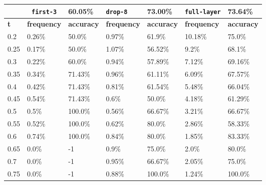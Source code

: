 
\begin{table}[t]
\centering
\begin{tabular}{lllllll} %
\hline

\multicolumn{1}{c}{}& 
\multicolumn{1}{c}{\texttt{first-3}} & \multicolumn{1}{l|}{60.05\%} 
& \multicolumn{1}{l}{\texttt{drop-8}} & \multicolumn{1}{l|}{73.00\%}
& \multicolumn{1}{l}{\texttt{full-layer}} & 73.64\%
\\ \hline
\multicolumn{1}{l|}{\textbf{t}} &
\multicolumn{1}{l|}{\textbf{frequency}} & 
\multicolumn{1}{l|}{\textbf{accuracy}} & 
\multicolumn{1}{l|}{\textbf{frequency}} & 
\multicolumn{1}{l|}{\textbf{accuracy}} & 
\multicolumn{1}{l|}{\textbf{frequency}} & 
\multicolumn{1}{l|}{\textbf{accuracy}} \\ \hline
	\multicolumn{1}{l|}{0.2}&  0.26\% & \multicolumn{1}{l|}{50.0\%}& 0.97\% & \multicolumn{1}{l|}{61.9\%}& 10.18\% & 75.0\%\\ 
\multicolumn{1}{l|}{0.25}&  0.17\% & \multicolumn{1}{l|}{50.0\%}& 1.07\% & \multicolumn{1}{l|}{56.52\%}& 9.2\% & 68.1\%\\ 
\multicolumn{1}{l|}{0.3}&  0.22\% & \multicolumn{1}{l|}{60.0\%}& 0.94\% & \multicolumn{1}{l|}{57.89\%}& 7.12\% & 69.16\%\\ 
\multicolumn{1}{l|}{0.35}&  0.34\% & \multicolumn{1}{l|}{71.43\%}& 0.96\% & \multicolumn{1}{l|}{61.11\%}& 6.09\% & 67.57\%\\ 
\multicolumn{1}{l|}{0.4}&  0.42\% & \multicolumn{1}{l|}{71.43\%}& 0.81\% & \multicolumn{1}{l|}{61.54\%}& 5.48\% & 66.04\%\\ 
\multicolumn{1}{l|}{0.45}&  0.54\% & \multicolumn{1}{l|}{71.43\%}& 0.6\% & \multicolumn{1}{l|}{50.0\%}& 4.18\% & 61.29\%\\ 
\multicolumn{1}{l|}{0.5}&  0.5\% & \multicolumn{1}{l|}{100.0\%}& 0.56\% & \multicolumn{1}{l|}{66.67\%}& 3.21\% & 66.67\%\\ 
\multicolumn{1}{l|}{0.55}&  0.52\% & \multicolumn{1}{l|}{100.0\%}& 0.62\% & \multicolumn{1}{l|}{80.0\%}& 2.86\% & 58.33\%\\ 
\multicolumn{1}{l|}{0.6}&  0.74\% & \multicolumn{1}{l|}{100.0\%}& 0.84\% & \multicolumn{1}{l|}{80.0\%}& 1.85\% & 83.33\%\\ 
\multicolumn{1}{l|}{0.65}&  0.0\% & \multicolumn{1}{l|}{-1}& 0.9\% & \multicolumn{1}{l|}{75.0\%}& 2.0\% & 80.0\%\\ 
\multicolumn{1}{l|}{0.7}&  0.0\% & \multicolumn{1}{l|}{-1}& 0.95\% & \multicolumn{1}{l|}{66.67\%}& 2.05\% & 75.0\%\\ 
\multicolumn{1}{l|}{0.75}&  0.0\% & \multicolumn{1}{l|}{-1}& 0.88\% & \multicolumn{1}{l|}{100.0\%}& 1.24\% & 100.0\%\\ 

\end{tabular}
\end{table}

